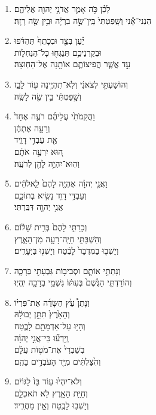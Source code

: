 \documentclass[12pt,a4paper,titlepage]{article}
\def \pscolor{red} %
\def \pslabelsep{-0.75em} %
\def \psleftmargin{0em} %
\begin{document}
\begin{hebrew}
\begin{enumerate}[leftmargin=\psleftmargin, labelsep=\pslabelsep, label=\fontspec{Linux Libertine}\arabic*, font=\color{\pscolor}\small\textsuperscript, parsep=0em, itemsep=0em, topsep=0em]
            \item לָכֵ֗ן כֹּ֥ה אָמַ֛ר אֲדֹנָ֥י יְהוִ֖ה אֲלֵיהֶ֑ם \\ הִנְנִי־אָ֕נִי וְשָֽׁפַטְתִּי֙ בֵּֽין־שֶׂ֣ה בִרְיָ֔ה וּבֵ֥ין שֶׂ֖ה רָזָֽה׃
            \item יַ֗עַן בְּצַ֤ד וּבְכָתֵף֙ תֶּהְדֹּ֔פוּ \\ וּבְקַרְנֵיכֶ֥ם תְּנַגְּח֖וּ כָּל־הַנַּחְל֑וֹת \\ עַ֣ד אֲשֶׁ֧ר הֲפִיצוֹתֶ֛ם אוֹתָ֖נָה אֶל־הַחֽוּצָה׃
            \item וְהוֹשַׁעְתִּ֣י לְצֹאנִ֔י וְלֹֽא־תִהְיֶ֥ינָה ע֖וֹד לָבַ֑ז \\ וְשָׁ֣פַטְתִּ֔י בֵּ֥ין שֶׂ֖ה לָשֶֽׂה׃
            \item וַהֲקִמֹתִ֙י עֲלֵיהֶ֜ם רֹעֶ֤ה אֶחָד֙ \\ וְרָעָ֣ה אֶתְהֶ֔ן \\ אֵ֖ת עַבְדִּ֣י דָוִ֑יד \\ ה֚וּא יִרְעֶ֣ה אֹתָ֔ם \\ וְהֽוּא־יִהְיֶ֥ה לָהֶ֖ן לְרֹעֶֽה׃
            \item וַאֲנִ֣י יְהוָ֗ה אֶהְיֶ֤ה לָהֶם֙ לֵֽאלֹהִ֔ים \\ וְעַבְדִּ֥י דָוִ֖ד נָשִׂ֣יא בְתוֹכָ֑ם \\ אֲנִ֥י יְהוָ֖ה דִּבַּֽרְתִּי׃
            \item וְכָרַתִּ֤י לָהֶם֙ בְּרִ֣ית שָׁל֔וֹם \\ וְהִשְׁבַּתִּ֥י חַיָּֽה־רָעָ֖ה מִן־הָאָ֑רֶץ \\ וְיָשְׁב֤וּ בַמִּדְבָּר֙ לָבֶ֔טַח וְיָשְׁנ֖וּ בַּיְּעָרִֽים׃
            \item וְנָתַתִּ֥י אוֹתָ֛ם וּסְבִיב֥וֹת גִּבְעָתִ֖י בְּרָכָ֑ה \\ וְהוֹרַדְתִּ֤י הַגֶּ֙שֶׁם֙ בְּעִתּ֔וֹ גִּשְׁמֵ֥י בְרָכָ֖ה יִֽהְיֽוּ׃
            \item וְנָתַן֩ עֵ֙ץ הַשָּׂדֶ֜ה אֶת־פִּרְי֗וֹ \\ וְהָאָ֙רֶץ֙ תִּתֵּ֣ן יְבוּלָ֔הּ \\ וְהָי֥וּ עַל־אַדְמָתָ֖ם לָבֶ֑טַח \\ וְֽיָדְע֞וּ כִּי־אֲנִ֣י יְהוָ֗ה \\ בְּשִׁבְרִי֙ אֶת־מֹט֣וֹת עֻלָּ֔ם \\ וְהִ֙צַּלְתִּ֔ים מִיַּ֖ד הָעֹבְדִ֥ים בָּהֶֽם׃
            \item וְלֹא־יִהְי֙וּ ע֥וֹד בַּז֙ לַגּוֹיִ֔ם \\ וְחַיַּ֥ת הָאָ֖רֶץ לֹ֣א תֹאכְלֵ֑ם \\ וְיָשְׁב֥וּ לָבֶ֖טַח וְאֵ֥ין מַחֲרִֽיד׃

\end{enumerate}
\end{hebrew}
\end{document}
